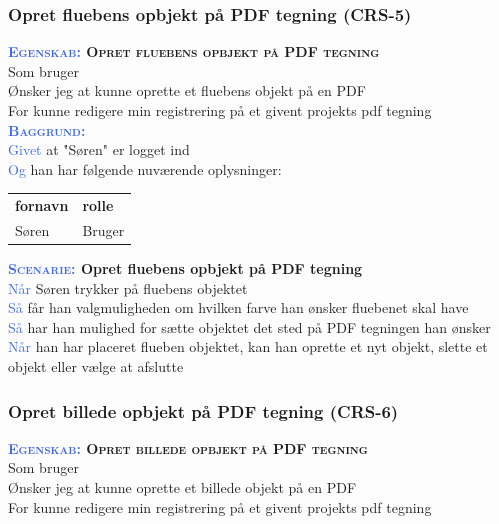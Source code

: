 \subsubsection{Opret fluebens opbjekt på PDF tegning (CRS-5)} \label{sec:USOpretFlueben}
\textbf{\textsc{\textcolor{RoyalBlue}{Egenskab:} Opret fluebens opbjekt på PDF tegning}}\\
Som bruger\\
Ønsker jeg at kunne oprette et fluebens objekt på en PDF\\
For kunne redigere min registrering på et givent projekts pdf tegning \\

\textsc{\textcolor{RoyalBlue}{\textbf{Baggrund:}}}\\
\textcolor{RoyalBlue}{Givet} at "Søren" er logget ind\\
\textcolor{RoyalBlue}{Og} han har følgende nuværende oplysninger:\\
\begin{tabular}{| l | l |}
	\textbf{fornavn} & \textbf{rolle} \\
	Søren & Bruger\\
\end{tabular}

\textbf{\textsc{\textcolor{RoyalBlue}{Scenarie:}} Opret fluebens opbjekt på PDF tegning}\\
\textcolor{RoyalBlue}{Når} Søren trykker på fluebens objektet\\
\textcolor{RoyalBlue}{Så}  får han valgmuligheden om hvilken farve han ønsker fluebenet skal have\\
\textcolor{RoyalBlue}{Så}  har han mulighed for sætte objektet det sted på PDF tegningen han ønsker\\
\textcolor{RoyalBlue}{Når} han har placeret flueben objektet, kan han oprette et nyt objekt, slette et objekt eller vælge at afslutte \\

\subsubsection{Opret billede opbjekt på PDF tegning (CRS-6)} \label{sec:USOpretBillede}
\textbf{\textsc{\textcolor{RoyalBlue}{Egenskab:} Opret billede opbjekt på PDF tegning}}\\
Som bruger\\
Ønsker jeg at kunne oprette et billede objekt på en PDF\\
For kunne redigere min registrering på et givent projekts pdf tegning \\


